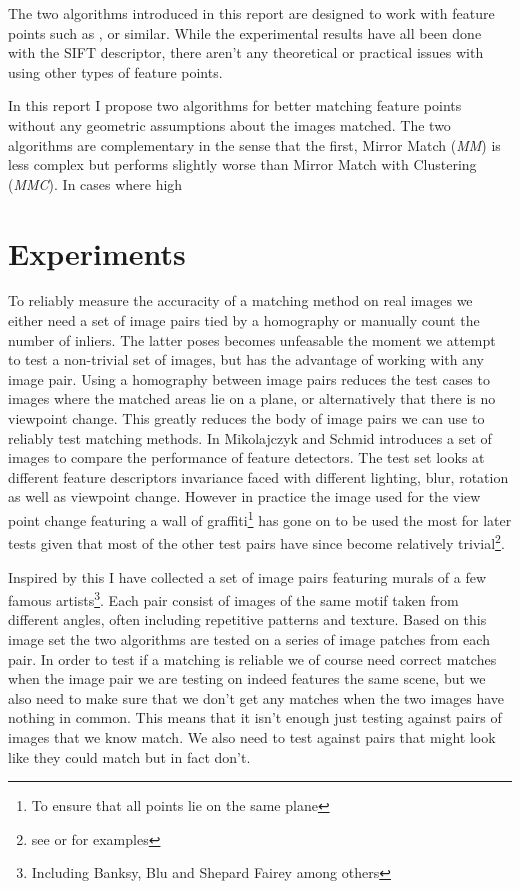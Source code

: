 \documentclass{article}
\begin{document}
The two algorithms introduced in this report are designed to work with 
feature points such as ,  or similar. While the experimental results 
have all been done with the SIFT descriptor, there aren't any 
theoretical or practical issues with using other types of feature 
points. 

In this report I propose two algorithms for better matching feature 
points without any geometric assumptions about the images matched. The 
two algorithms are complementary in the sense that the first, Mirror 
Match (\emph{MM}) is less complex but performs slightly worse than 
Mirror Match with Clustering (\emph{MMC}). In cases where high 


\section{Experiments}
\label{experiment}

To reliably measure the accuracity of a matching method on real images 
we either need a set of image pairs tied by a homography or manually 
count the number of inliers. The latter poses becomes unfeasable the 
moment we attempt to test a non-trivial set of images, but has the 
advantage of working with any image pair. Using a homography between 
image pairs reduces the test cases to images where the matched areas lie 
on a plane, or alternatively that there is no viewpoint change. This 
greatly reduces the body of image pairs we can use to reliably test 
matching methods. In \cite{mikolaczyk2005performance} Mikolajczyk and 
Schmid introduces a set of images to compare the performance of feature 
detectors. The test set looks at different feature descriptors 
invariance faced with different lighting, blur, rotation as well as 
viewpoint change. However in practice the image used for the view point 
change featuring a wall of graffiti\footnote{To ensure that all points 
lie on the same plane} has gone on to be used the most for later tests 
given that most of the other test pairs have since become relatively 
trivial\footnote{see \cite{wu2011robust} or \cite{delponte2006svd} for 
examples}.

Inspired by this I have collected a set of image pairs featuring murals 
of a few famous artists\footnote{Including Banksy, Blu and Shepard 
Fairey among others}. Each pair consist of images of the same motif 
taken from different angles, often including repetitive patterns and 
texture. Based on this image set the two algorithms are tested on a 
series of image patches from each pair. In order to test if a matching 
is reliable we of course need correct matches when the image pair we are 
testing on indeed features the same scene, but we also need to make sure 
that we don't get any matches when the two images have nothing in 
common. This means that it isn't enough just testing against pairs of 
images that we know match. We also need to test against pairs that might 
look like they could match but in fact don't.
\end{document}
